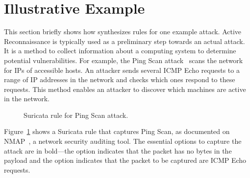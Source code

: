 \documentclass[conference]{IEEEtran}
\begin{document}





\section{Illustrative Example}
\label{sec:suri-metas-coverage}
\label{sec:active-recon}

This section briefly shows how \tname{} synthesizes rules for one
example attack. Active Reconnaissance is typically used as a
preliminary step towards an actual attack. It is a method to collect
information about a computing system to determine potential
vulnerabilities. For example, the Ping Scan attack~\cite{ping-scan}
scans the network for IPs of accessible hosts. An attacker sends
several ICMP Echo requests to a range of IP addresses in the network
and checks which ones respond to these requests. This method enables
an attacker to discover which machines are active in the network.

\begin{figure}[h!]
  
  \vspace{-1ex}  
  \caption{Suricata rule for Ping Scan attack.}
  \vspace{-2ex}  
  \label{fig:pingscan-example}
\end{figure}

Figure~\ref{fig:pingscan-example} shows a Suricata rule that captures
Ping Scan, as documented on NMAP~\cite{netmap}, a network security
auditing tool. The essential options to capture the attack are in
bold---the option  indicates that the packet has no
bytes in the payload and the option  indicates that
the packet to be captured are ICMP Echo requests.
\end{document}
